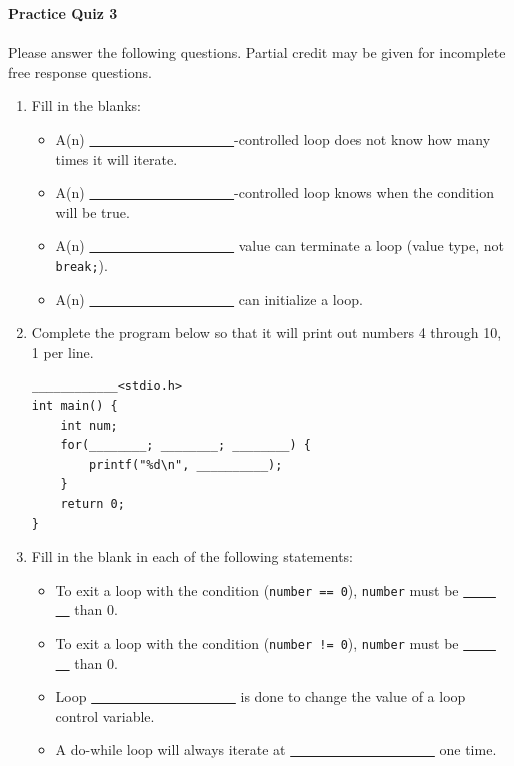 \documentclass[letter,11pt]{article}
\begin{document}
\huge
\textbf{Practice Quiz 3}
\normalsize

\paragraph{}Please answer the following questions. Partial credit may be given for incomplete free response questions.

\begin{enumerate}
    \item Fill in the blanks:
    \begin{itemize}
        \item A(n) \underline{~~ ~~ ~~ ~~ ~~ ~~ ~~ ~~}-controlled loop does not know how many times it will iterate.
        \item A(n) \underline{~~ ~~ ~~ ~~ ~~ ~~ ~~ ~~}-controlled loop knows when the condition will be true.
        \item A(n) \underline{~~ ~~ ~~ ~~ ~~ ~~ ~~ ~~} value can terminate a loop (value type, not \texttt{break;}).
        \item A(n) \underline{~~ ~~ ~~ ~~ ~~ ~~ ~~ ~~} can initialize a loop.
    \end{itemize}
    
    \item Complete the program below so that it will print out numbers 4 through 10, 1 per line.
    \begin{verbatim}
____________<stdio.h>
int main() {
    int num;
    for(________; ________; ________) {
        printf("%d\n", __________);
    }
    return 0;
}
    \end{verbatim}
    
    \item Fill in the blank in each of the following statements:
    \begin{itemize}
        \item To exit a loop with the condition (\texttt{number == 0}), \texttt{number} must be \underline{~~ ~~ ~~} than 0.
        \item To exit a loop with the condition (\texttt{number != 0}), \texttt{number} must be \underline{~~ ~~ ~~} than 0.
        \item Loop \underline{~~ ~~ ~~ ~~ ~~ ~~ ~~ ~~} is done to change the value of a loop control variable.
        \item A do-while loop will always iterate at \underline{~~ ~~ ~~ ~~ ~~ ~~ ~~ ~~} one time.
    \end{itemize}
    

\end{enumerate}
\end{document}
